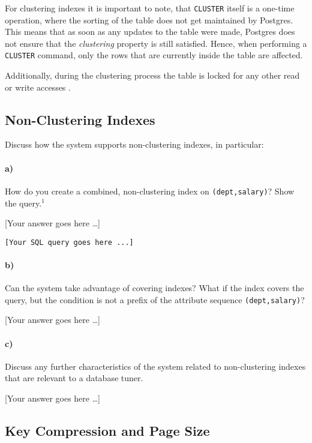 \documentclass[11pt]{scrartcl}
\newcommand{\youranswerhere}{[Your answer goes here \ldots]}
\begin{document}
For clustering indexes it is important to note, that \texttt{CLUSTER} itself is a one-time operation, where the
sorting of the table does not get maintained by Postgres.
This means that as soon as any updates to the table were made, Postgres does not ensure that the \textit{clustering}
property is still satisfied.
Hence, when performing a \texttt{CLUSTER} command, only the rows that are currently inside the table are affected.

Additionally, during the clustering process the table is locked for any other read or write accesses \cite{PostgreSQL2024Cluster}.

\subsection{Non-Clustering Indexes}

Discuss how the system supports non-clustering indexes, in particular:

\paragraph{a)}

How do you create a combined, non-clustering index on \texttt{(dept,salary)}? Show the query.$^1$

\youranswerhere{}

\begin{lstlisting}[style=dbtsql]
[Your SQL query goes here ...]
\end{lstlisting}

\paragraph{b)}

Can the system take advantage of covering indexes? What if the index covers the query, but the condition is not a prefix of the attribute sequence \texttt{(dept,salary)}?

\youranswerhere{}

\paragraph{c)}

Discuss any further characteristics of the system related to non-clustering indexes that are relevant to a database tuner.

\youranswerhere{}

\subsection{Key Compression and Page Size}
\end{document}
